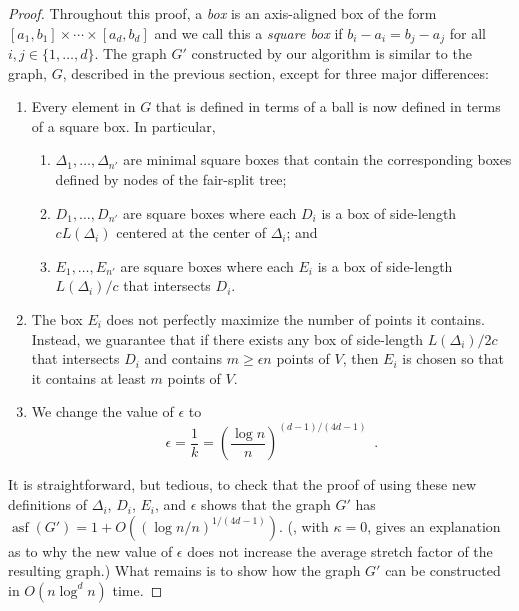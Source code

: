 \documentclass{patmorin}
\DeclareMathOperator{\asf}{asf}
\begin{document}
\begin{proof}
  Throughout this proof, a \emph{box} is an axis-aligned box of the form
  $[a_1,b_1]\times\cdots\times[a_d,b_d]$ and we call this a \emph{square
  box} if $b_i-a_i=b_j-a_j$ for all $i,j\in\{1,\ldots,d\}$.  The graph
  $G'$ constructed by our algorithm is similar to the graph, $G$,
  described in the previous section, except for three major differences:
  \begin{enumerate}
     \item Every element in $G$ that is defined in terms of a ball is
     now defined in terms of a square box.  In particular,
     \begin{enumerate}
       \item $\Delta_1,\ldots,\Delta_{n'}$ are minimal square boxes that contain
         the corresponding boxes defined by nodes of the fair-split tree;
       \item $D_1,\ldots,D_{n'}$ are square boxes where each $D_i$ is a box of
         side-length $cL(\Delta_i)$ centered at the center of $\Delta_i$;
         and
       \item $E_1,\ldots,E_{n'}$ are square boxes where each $E_i$ is a box of
         side-length $L(\Delta_i)/c$ that intersects $D_i$.
     \end{enumerate}
     \item The box $E_i$ does not perfectly maximize the number of points
       it contains. Instead, we guarantee that if there exists any
       box of side-length $L(\Delta_i)/2c$ that intersects $D_i$ and
       contains $m\ge \epsilon n$ points of $V$, then $E_i$ is chosen so that
       it contains at least $m$ points of $V$.
     \item We change the value of $\epsilon$ to 
      \[  \epsilon = \frac{1}{k} = \left(\frac{\log n}{n}\right)^{(d-1)/(4d-1)} \enspace . \]
  \end{enumerate} 
  It is straightforward, but tedious, to check that the proof of
   using these new definitions of $\Delta_i$, $D_i$,
  $E_i$, and $\epsilon$ shows that the graph $G'$ has $\asf(G')= 1+O((\log
  n/n)^{1/(4d-1)})$.  (, with $\kappa=0$, gives
  an explanation as to why the new value of $\epsilon$ does not increase
  the average stretch factor of the resulting graph.)  What remains is
  to show how the graph $G'$ can be constructed in $O(n\log^d n)$ time.


\end{proof}
\end{document}
